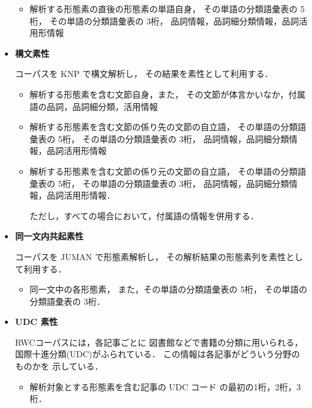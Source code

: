\begin{itemize}
\begin{itemize}
  \item 
    解析する形態素の直後の形態素の単語自身，
    その単語の分類語彙表の 5桁，
    その単語の分類語彙表の 3桁，
    品詞情報，品詞細分類情報，品詞活用形情報

  \end{itemize}

\item 
  {\bf 構文素性}

  コーパスを KNP\cite{KNP2.0b6} で構文解析し，
  その結果を素性として利用する．

  \begin{itemize}
  \item 
    解析する形態素を含む文節自身，また，
    その文節が体言かいなか，付属語の品詞，品詞細分類，活用情報

  \item 
    解析する形態素を含む文節の係り先の文節の自立語，
    その単語の分類語彙表の 5桁，
    その単語の分類語彙表の 3桁，
    品詞情報，品詞細分類情報，品詞活用形情報
    
  \item 
    解析する形態素を含む文節の係り元の文節の自立語，
    その単語の分類語彙表の 5桁，
    その単語の分類語彙表の 3桁，
    品詞情報，品詞細分類情報，品詞活用形情報．

    ただし，すべての場合において，付属語の情報を併用する．
    
  \end{itemize}

\item 
  {\bf 同一文内共起素性}

  コーパスを JUMAN で形態素解析し，
  その解析結果の形態素列を素性として利用する．

  \begin{itemize}
  \item 
    同一文中の各形態素，
    また，その単語の分類語彙表の 5桁，
    その単語の分類語彙表の 3桁．
    
  \end{itemize}

\item 
  {\bf UDC 素性}

  RWCコーパスには，各記事ごとに
  図書館などで書籍の分類に用いられる，
  国際十進分類(UDC)がふられている．
  この情報は各記事がどういう分野のものかを
  示している．

  \begin{itemize}
  \item 
    解析対象とする形態素を含む記事の UDC コード
    の最初の1桁，2桁，3桁．
    
  \end{itemize}
\end{itemize}

